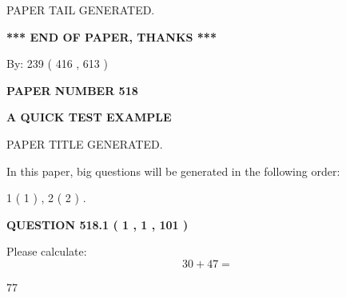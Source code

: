 \documentclass[12pt]{article}
\begin{document}
   
   
   
   
   
 \vspace{0.2in}
 
   
   
\vspace{2.0in} PAPER TAIL GENERATED.
   
   
   
   
\vspace{1.0in} 
{\textbf{\large{ *** END OF PAPER, THANKS *** }}} 
   
   
\hspace{1.0in} By: 
 239 ( 416 ,  613 )
   
   
   
   
\newpage 
\setcounter{page}{ 
   518001 } 
   
   
   
   
 {\textbf{ \Large{ PAPER NUMBER  518  }}}
   
   
\vspace{0.2in}
   
   
   
   
   
   
   
   
 \vspace{0.2in}
{\LARGE {\textbf{ A QUICK TEST EXAMPLE}}}
   
   
 PAPER TITLE GENERATED.
   
   
   
\vspace{0.2in}
   
In this paper, big questions will be generated in the following order: 
   
   
   1 ( 1 )
 ,
   2 ( 2 )
 .
  
\vspace{0.2in}
  
{\textbf{\Large{QUESTION
518.1 
 ( 1 , 1 , 101 )
}}}
  
  
 
Please calculate:
\begin{equation}
30 +  %
47 = \nonumber
\end{equation}
 
 
 
\noindent{}
 
 

77
 
\end{document}
